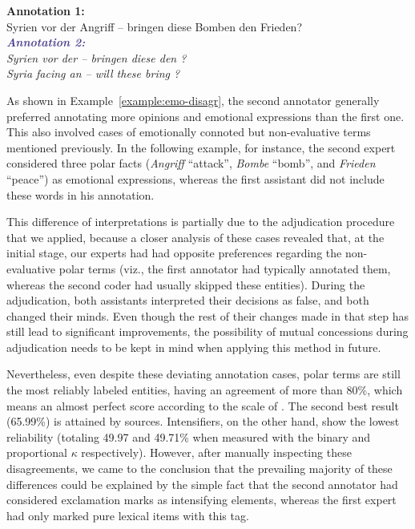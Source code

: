 \begin{example}\label{example:emo-disagr}
  \textcolor{red3}{\textbf{Annotation 1:}}\\
  \upshape{}Syrien vor der Angriff -- bringen diese Bomben den Frieden?\\[0.8em]\itshape
  \noindent\textcolor{darkslateblue}{\textbf{\itshape Annotation
      2:}}\\
  \upshape{}Syrien vor der \emoexpression{\textcolor{red}{Angriff}}
  -- bringen diese \emoexpression{\textcolor{red}{Bomben}} den
  \emoexpression{\textcolor{red}{Frieden}}?\\[0.3em]
  \noindent\itshape{}Syria facing an
  \upshape{}\itshape{}
  -- will these
  \upshape{}\itshape{}
  bring
  \upshape{}\itshape{}?
\end{example}

As shown in Example~\ref{example:emo-disagr}, the second annotator
generally preferred annotating more opinions and emotional expressions
than the first one.  This also involved cases of emotionally connoted
but non-evaluative terms mentioned previously. In the following
example, for instance, the second expert considered three polar facts
(\emph{Angriff} ``attack'', \emph{Bombe} ``bomb'', and \emph{Frieden}
``peace'') as emotional expressions, whereas the first assistant did
not include these words in his annotation.

This difference of interpretations is partially due to the
adjudication procedure that we applied, because a closer analysis of
these cases revealed that, at the initial stage, our experts had had
opposite preferences regarding the non-evaluative polar terms (viz.,
the first annotator had typically annotated them, whereas the second
coder had usually skipped these entities).  During the adjudication,
both assistants interpreted their decisions as false, and both changed
their minds.  Even though the rest of their changes made in that step
has still lead to significant improvements, the possibility of mutual
concessions during adjudication needs to be kept in mind when applying
this method in future.

Nevertheless, even despite these deviating annotation cases, polar
terms are still the most reliably labeled entities, having an
agreement of more than $80\%$, which means an almost perfect score
according to the scale of \citet{Landis:77}.  The second best result
(65.99\%) is attained by sources.  Intensifiers, on the other hand,
show the lowest reliability (totaling 49.97 and 49.71\% when measured
with the binary and proportional $\kappa$ respectively).  However,
after manually inspecting these disagreements, we came to the
conclusion that the prevailing majority of these differences could be
explained by the simple fact that the second annotator had considered
exclamation marks as intensifying elements, whereas the first expert
had only marked pure lexical items with this tag.

